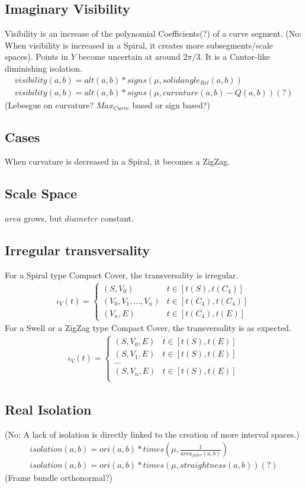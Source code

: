 \documentclass{report}
\begin{document}
\subsection{Imaginary Visibility}
Visibility is an increase of the polynomial Coefficients(?) of a curve segment.
(No: When visibility is increased in a Spiral, it creates more subsegments/scale spaces). Points in $Y$ become uncertain at around $2\pi/3$. It is a Cantor-like diminishing isolation.
\begin{align}
visibility(a,b)= alt(a,b) * signs(\mu,solidangle_{Rel}(a,b))\\
visibility(a,b)= alt(a,b) * signs(\mu,curvature(a,b)-Q(a,b))(?)
\end{align}
(Lebesgue on curvature? $Max_{Curve}$ based or sign based?)
\subsection*{Cases}
When curvature is decreased in a Spiral, it becomes a ZigZag.
\subsection*{Scale Space}
$area$ grows, but $diameter$ constant.
\subsection*{Irregular transversality}
For a Spiral type Compact Cover, the transversality is irregular.
\begin{align*}
\iota_{V}(t) =
\begin{cases}
(S,V_{0}) & t \in [t(S),t(C_{4})]\\
(V_{0},V_{1}, ... , V_{n}) & t \in [t(C_{4}),t(C_{4})]\\
(V_{n},E) & t \in [t(C_{4}),t(E)]
\end{cases}
\end{align*}
For a Swell or a ZigZag type Compact Cover, the transversality is as expected.
\begin{align*}
\iota_{V}(t) =
\begin{cases}
(S,V_{0},E) & t \in [t(S),t(E)]\\
(S,V_{1},E) & t \in [t(S),t(E)]\\
...\\
(S,V_{n},E) & t \in [t(S),t(E)]\\
\end{cases}
\end{align*}

\subsection{Real Isolation}
(No: A lack of isolation is directly linked to the creation of more interval spaces.)
\begin{align}
isolation(a,b) = ori(a,b)*times(\mu,\frac{1}{area_{jitter}(a,b)})\\
isolation(a,b) = ori(a,b)*times(\mu,straightness(a,b))(?)
\end{align}
(Frame bundle orthonormal?)
\end{document}
